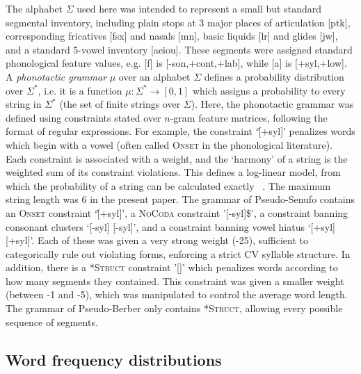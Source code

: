 \documentclass[11pt]{article}
\begin{document}
The alphabet $\Sigma$ used here was intended to represent a small but standard segmental inventory, including plain stops at 3 major places of articulation [ptk], corresponding fricatives [fsx] and nasals [mn\engma], basic liquids [lr] and glides [jw], and a standard 5-vowel inventory [aeiou]. These segments were assigned standard phonological feature values, e.g. [f] is [-son,+cont,+lab], while [a] is [+syl,+low]. %
A \textit{phonotactic grammar} $\mu$ over an alphabet $\Sigma$ defines a probability distribution over $\Sigma^*$, i.e. it is a function $\mu : \Sigma^* \rightarrow [0,1]$ which assigns a probability to every string in $\Sigma^*$ (the set of finite strings over $\Sigma$). Here, the phonotactic grammar was defined using constraints stated over $n$-gram feature matrices, following the format of regular expressions. For example, the constraint `\^[+syl]' penalizes words which begin with a vowel (often called \textsc{Onset} in the phonological literature). Each constraint is associated with a weight, and the `harmony' of a string is the weighted sum of its constraint violations. This defines a log-linear model, from which the probability of a string can be calculated exactly ~\cite{Hayes08a}. The maximum string length was 6 in the present paper. The grammar of Pseudo-Senufo contains an \textsc{Onset} constraint `\^[+syl]', a \textsc{NoCoda} constraint '[-syl]\$', a constraint banning consonant clusters `[-syl] [-syl]', and a constraint banning vowel hiatus `[+syl] [+syl]'. Each of these was given a very strong weight (-25), sufficient to categorically rule out violating forms, enforcing a strict CV syllable structure. In addition, there is a \textsc{*Struct} constraint '[]' which penalizes words according to how many segments they contained. This constraint was given a smaller weight (between -1 and -5), which was manipulated to control the average word length. The grammar of Pseudo-Berber only contains \textsc{*Struct}, allowing every possible sequence of segments. 

\subsection{Word frequency distributions}
\end{document}

